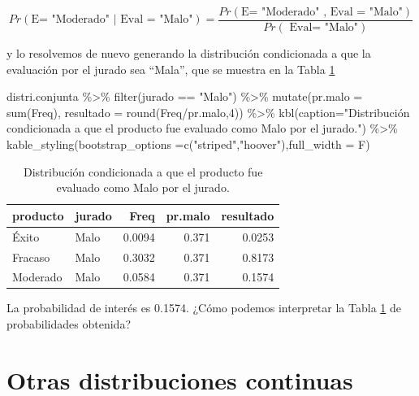 \documentclass[
]{book}
\newenvironment{Shaded}{\begin{snugshade}}{\end{snugshade}}
\newcommand{\AttributeTok}[1]{\textcolor[rgb]{0.77,0.63,0.00}{#1}}
\newcommand{\DecValTok}[1]{\textcolor[rgb]{0.00,0.00,0.81}{#1}}
\newcommand{\FunctionTok}[1]{\textcolor[rgb]{0.00,0.00,0.00}{#1}}
\newcommand{\NormalTok}[1]{#1}
\newcommand{\SpecialCharTok}[1]{\textcolor[rgb]{0.00,0.00,0.00}{#1}}
\newcommand{\StringTok}[1]{\textcolor[rgb]{0.31,0.60,0.02}{#1}}
\theoremstyle{definition}
\theoremstyle{definition}
\theoremstyle{definition}
\theoremstyle{definition}
\theoremstyle{remark}
\begin{document}
\[Pr(\text{E= "Moderado" | Eval = "Malo"}) = \frac{Pr(\text{E= "Moderado" , Eval = "Malo"})}{Pr(\text{ Eval= "Malo"})}\]

y lo resolvemos de nuevo generando la distribución condicionada a que la evaluación por el jurado sea ``Mala'', que se muestra en la Tabla \ref{tab:01-032}

\begin{Shaded}
\begin{Highlighting}[]
\NormalTok{distri.conjunta }\SpecialCharTok{\%\textgreater{}\%} 
  \FunctionTok{filter}\NormalTok{(jurado }\SpecialCharTok{==} \StringTok{"Malo"}\NormalTok{) }\SpecialCharTok{\%\textgreater{}\%}
  \FunctionTok{mutate}\NormalTok{(}\AttributeTok{pr.malo =} \FunctionTok{sum}\NormalTok{(Freq), }\AttributeTok{resultado =} \FunctionTok{round}\NormalTok{(Freq}\SpecialCharTok{/}\NormalTok{pr.malo,}\DecValTok{4}\NormalTok{)) }\SpecialCharTok{\%\textgreater{}\%}
  \FunctionTok{kbl}\NormalTok{(}\AttributeTok{caption=}\StringTok{"Distribución condicionada a que el producto fue evaluado como Malo por el jurado."}\NormalTok{) }\SpecialCharTok{\%\textgreater{}\%}
  \FunctionTok{kable\_styling}\NormalTok{(}\AttributeTok{bootstrap\_options =}\FunctionTok{c}\NormalTok{(}\StringTok{"striped"}\NormalTok{,}\StringTok{"hoover"}\NormalTok{),}\AttributeTok{full\_width =}\NormalTok{ F)}
\end{Highlighting}
\end{Shaded}

\begin{table}

\caption{\label{tab:01-032}Distribución condicionada a que el producto fue evaluado como Malo por el jurado.}
\centering
\begin{tabular}[t]{l|l|r|r|r}
\hline
producto & jurado & Freq & pr.malo & resultado\\
\hline
Éxito & Malo & 0.0094 & 0.371 & 0.0253\\
\hline
Fracaso & Malo & 0.3032 & 0.371 & 0.8173\\
\hline
Moderado & Malo & 0.0584 & 0.371 & 0.1574\\
\hline
\end{tabular}
\end{table}

La probabilidad de interés es 0.1574. ¿Cómo podemos interpretar la Tabla \ref{tab:01-032} de probabilidades obtenida?

\hypertarget{otras-distribuciones-continuas}{%
\section{Otras distribuciones continuas}\label{otras-distribuciones-continuas}}
\end{document}
